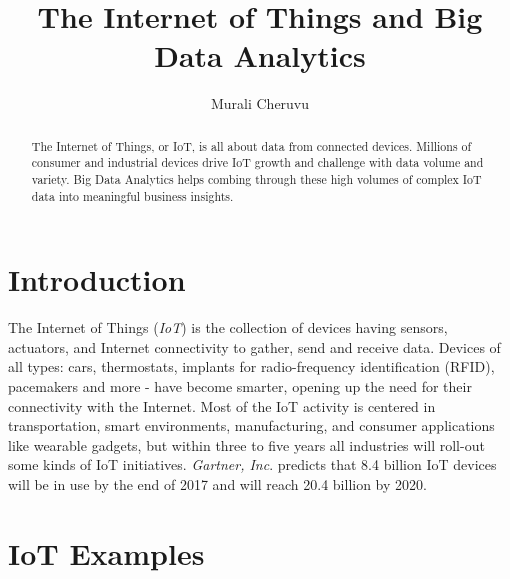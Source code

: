 \documentclass[sigconf]{acmart}
\begin{document}
	\title{The Internet of Things and Big Data Analytics}
	
	
	\author{Murali Cheruvu}
	
	\renewcommand{\shortauthors}{M. Cheruvu}
	
	
	\begin{abstract}
		
		The Internet of Things, or IoT, is all about data from connected devices. Millions of consumer and industrial devices drive IoT growth and challenge with data volume and variety. Big Data Analytics helps combing through these high volumes of complex IoT data into meaningful business insights.
		
	\end{abstract}
	
	
	\maketitle
		
	\section{Introduction}	
	
	The Internet of Things ({\em IoT}) is the collection of devices having sensors, actuators, and Internet connectivity to gather, send and receive data. Devices of all types: cars, thermostats, implants for radio-frequency identification (RFID), pacemakers and more - have become smarter, opening up the need for their connectivity with the Internet. Most of the IoT activity is centered in transportation, smart environments, manufacturing, and consumer applications like wearable gadgets, but within three to five years all industries will roll-out some kinds of IoT initiatives. {\em Gartner, Inc}. predicts that 8.4 billion IoT devices will be in use by the end of 2017 and will reach 20.4 billion by 2020\cite{gartner}. 
	
	\section{IoT Examples}
	
\end{document}
